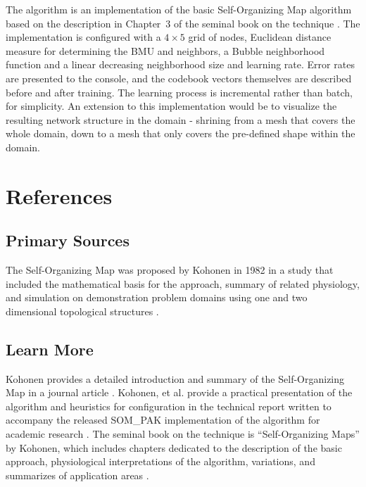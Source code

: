 \documentclass[a4paper, 11pt]{article}
\begin{document}
The algorithm is an implementation of the basic Self-Organizing Map algorithm based on the description in Chapter~3 of the seminal book on the technique \cite{Kohonen1995}. The implementation is configured with a $4 \times 5$ grid of nodes, Euclidean distance measure for determining the BMU and neighbors, a Bubble neighborhood function and a linear decreasing neighborhood size and learning rate. Error rates are presented to the console, and the codebook vectors themselves are described before and after training. The learning process is incremental rather than batch, for simplicity. An extension to this implementation would be to visualize the resulting network structure in the domain - shrining from a mesh that covers the whole domain, down to a mesh that only covers the pre-defined shape within the domain.




\section{References}
\label{sec:references}

% 
% 
\subsection{Primary Sources}
The Self-Organizing Map was proposed by Kohonen in 1982 in a study that included the mathematical basis for the approach, summary of related physiology, and simulation on demonstration problem domains using one and two dimensional topological structures \cite{Kohonen1982}.

% 
% 
\subsection{Learn More}
Kohonen provides a detailed introduction and summary of the Self-Organizing Map in a journal article \cite{Kohonen1990a}.
Kohonen, et al. provide a practical presentation of the algorithm and heuristics for configuration in the technical report written to accompany the released SOM\_PAK implementation of the algorithm for academic research \cite{Kohonen1996a}.
The seminal book on the technique is ``Self-Organizing Maps'' by Kohonen, which includes chapters dedicated to the description of the basic approach, physiological interpretations of the algorithm, variations, and summarizes of application areas \cite{Kohonen1995}.
\end{document}
